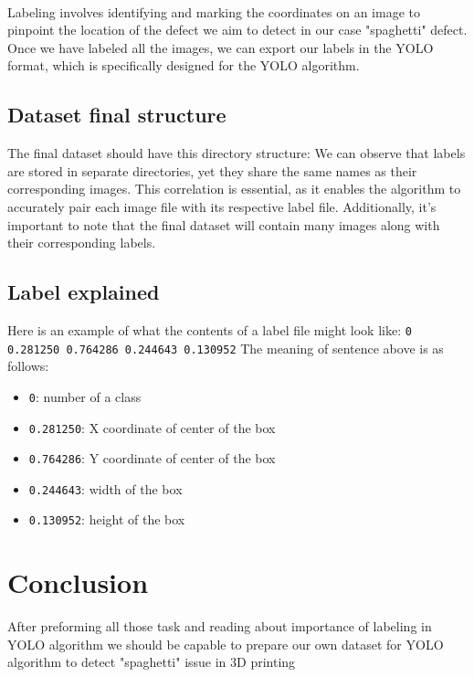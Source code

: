 \documentclass[12pt,a4paper]{article}
\begin{document}
\\Labeling involves identifying and marking the coordinates on an image to pinpoint the location of the defect we aim to detect in our case "spaghetti" defect. Once we have labeled all the images, we can export our labels in the YOLO format, which is specifically designed for the YOLO algorithm. 
\subsection{Dataset final structure}

The final dataset should have this directory structure:
{}
We can observe that labels are stored in separate directories, yet they share the same names as their corresponding images. This correlation is essential, as it enables the algorithm to accurately pair each image file with its respective label file. Additionally, it's important to note that the final dataset will contain many images along with their corresponding labels.
\newpage

\subsection{Label explained}
\noindent
Here is an example of what the contents of a label file might look like: \smallbreak
\verb|0 0.281250 0.764286 0.244643 0.130952| \smallbreak
\noindent
The meaning of sentence above is as follows: 
\begin{itemize}
    \item \verb|0|: number of a class
    \item \verb|0.281250|: X coordinate of center of the box
    \item \verb|0.764286|: Y coordinate of center of the box
    \item \verb|0.244643|: width of the box
    \item \verb|0.130952|: height of the box
\end{itemize}

\section{Conclusion}
After preforming all those task and reading about importance of labeling in YOLO algorithm we should be capable to prepare our own dataset for YOLO algorithm to detect "spaghetti" issue in 3D printing
\end{document}
